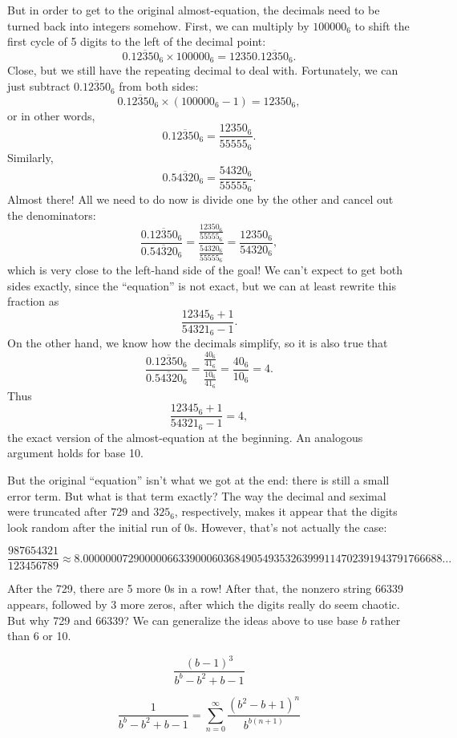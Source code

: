 \documentclass{article}
\begin{document}
But in order to get to the original almost-equation,
the decimals need to be turned back into integers somehow.
First, we can multiply by $100000_6$
to shift the first cycle of 5 digits to the left of the decimal point:
\[0.\overline{12350}_6 \times 100000_6 = 12350.\overline{12350}_6.\]
Close, but we still have the repeating decimal to deal with.
Fortunately, we can just subtract $0.\overline{12350}_6$ from both sides:
\[0.\overline{12350}_6 \times (100000_6-1) = 12350_6,\]
or in other words,
\[0.\overline{12350}_6 = \frac{12350_6}{55555_6}.\]
Similarly,
\[0.\overline{54320}_6 = \frac{54320_6}{55555_6}.\]
Almost there! All we need to do now is divide one by the other
and cancel out the denominators:
\[\frac{0.\overline{12350}_6}{0.\overline{54320}_6}=
\frac{\frac{12350_6}{55555_6}}{\frac{54320_6}{55555_6}}
=\frac{12350_6}{54320_6},\]
which is very close to the left-hand side of the goal!
We can't expect to get both sides exactly,
since the ``equation'' is not exact,
but we can at least rewrite this fraction as
\[\frac{12345_6+1}{54321_6-1}.\]
On the other hand,
we know how the decimals simplify,
so it is also true that
\[\frac{0.\overline{12350}_6}{0.\overline{54320}_6}
=\frac{\frac{40_6}{41_6}}{\frac{10_6}{41_6}}=\frac{40_6}{10_6}=4.\]
Thus
\[\frac{12345_6+1}{54321_6-1}=4,\]
the exact version of the almost-equation at the beginning.
An analogous argument holds for base 10.

\newpage

But the original ``equation'' isn't what we got at the end:
there is still a small error term.
But what is that term exactly?
The way the decimal and seximal were truncated after $729$ and $325_6$, respectively,
makes it appear that the digits look random after the initial run of 0s.
However, that's not actually the case:

\[\frac{987654321}{123456789} \approx 8.0000000729000006633900060368490549353263999114702391943791766688\ldots\]

After the 729, there are 5 more 0s in a row!
After that, the nonzero string 66339 appears,
followed by 3 more zeros,
after which the digits really do seem chaotic.
But why 729 and 66339?
We can generalize the ideas above to use base $b$ rather than 6 or 10.

\[\frac{(b-1)^3}{b^b-b^2+b-1}\]

\[\frac{1}{b^b-b^2+b-1} = \sum_{n=0}^\infty \frac{(b^2-b+1)^n}{b^{b(n+1)}} \]
\end{document}
